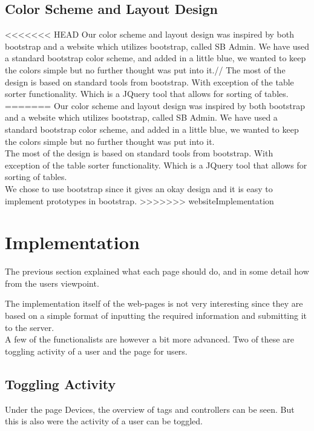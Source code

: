 \subsection{Color Scheme and Layout Design}
<<<<<<< HEAD
Our color scheme and layout design was inspired by both bootstrap and a website which utilizes bootstrap, called SB Admin\citep{sbadmin}. We have used a standard bootstrap color scheme, and added in a little blue, we wanted to keep the colors simple but no further thought was put into it.//
The most of the design is based on standard tools from bootstrap. With exception of the table sorter functionality. Which is a JQuery tool that allows for sorting of tables.
=======
Our color scheme and layout design was inspired by both bootstrap and a website which utilizes bootstrap, called SB Admin\citep{sbadmin}. We have used a standard bootstrap color scheme, and added in a little blue, we wanted to keep the colors simple but no further thought was put into it.\\
The most of the design is based on standard tools from bootstrap. With exception of the table sorter functionality. Which is a JQuery tool that allows for sorting of tables.\\
We chose to use bootstrap since it gives an okay design and it is easy to implement prototypes in bootstrap.	
>>>>>>> websiteImplementation


\section{Implementation}
The previous section explained what each page should do, and in some detail how from the users viewpoint.

The implementation itself of the web-pages is not very interesting since they are based on a simple format of inputting the required information and submitting it to the server.\\
A few of the functionalists are however a bit more advanced. Two of these are toggling activity of a user and the page for users.\\

\subsection{Toggling Activity}

Under the page Devices, the overview of tags and controllers can be seen. But this is also were the activity of a user can be toggled.

